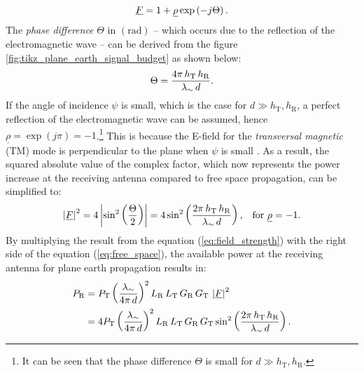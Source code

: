 \begin{equation} \label{eq:field_strength}
	\centering
	\underline{F} = 1 + \underline{\rho} \exp \left( - j \Theta \right)\text{.}
\end{equation}
The \emph{phase difference} $\Theta$ in $\left(\mathrm{rad}\right)$ -- which occurs due to the reflection of the electromagnetic wave -- can be derived from the figure \ref{fig:tikz_plane_earth_signal_budget} as shown below:
\begin{equation} \label{eq:phase_difference}
	\centering
	\Theta = \dfrac{4\pi \, h_\mathrm{T} \, h_\mathrm{R}}{\lambda_\sim \, d}\text{.}
\end{equation}
If the angle of incidence $\psi$ is small, which is the case for $d \gg h_\mathrm{T}, h_\mathrm{R}$, a perfect reflection of the electromagnetic wave can be assumed, hence $\underline{\rho} = \exp(j\pi) = -1$.\footnote{It can be seen that the phase difference $\Theta$ is small for $d \gg h_\mathrm{T}, h_\mathrm{R}$.} This is because the E-field for the \emph{transversal magnetic} (TM) mode is perpendicular to the plane when $\psi$ is small \cite{Mecklenbrauker:2017}. As a result, the squared absolute value of the complex factor, which now represents the power increase at the receiving antenna compared to free space propagation, can be simplified to:
\begin{equation} \label{eq:field_strength}
	\centering
	\left|\underline{F}\right|^2 = 4 \left| \sin^2 \left(\dfrac{\Theta}{2}\right) \right| = 4 \sin^2 \left(\dfrac{2\pi \, h_\mathrm{T} \, h_\mathrm{R}}{\lambda_\sim \, d}\right) \text{,} \quad \text{for } \underline{\rho} = -1\text{.}
\end{equation}
By multiplying the result from the equation (\ref{eq:field_strength}) with the right side of the equation (\ref{eq:free_space}), the available power at the receiving antenna for plane earth propagation results in: 
\begin{equation} \label{eq:plane_earth}
	\centering
	\begin{aligned}
	P_\mathrm{R} & = P_\mathrm{T} \left(\dfrac{\lambda_\sim}{4 \pi \, d}\right)^2 L_\mathrm{R} \, L_\mathrm{T} \, G_\mathrm{R} \, G_\mathrm{T} \, \left|\underline{F}\right|^2 \\
				 & = 4P_\mathrm{T} \left(\dfrac{\lambda_\sim}{4 \pi \, d}\right)^2 L_\mathrm{R} \, L_\mathrm{T} \, G_\mathrm{R} \, G_\mathrm{T} \sin^2 \left(\dfrac{2\pi \, h_\mathrm{T} \, h_\mathrm{R}}{\lambda_\sim \, d}\right)\text{.}
	\end{aligned}
\end{equation}
